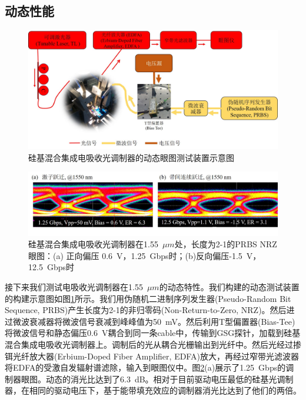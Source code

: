 \subsection{动态性能}
\begin{figure}[htb]
	\centering
	\includegraphics[width=15cm]{./Pictures/chapt4_dynamic_measure_setup.jpg}
	\caption{硅基混合集成电吸收光调制器的动态眼图测试装置示意图}
	\label{chapt4_dynamic_measure_setup}
\end{figure}
\begin{figure}[htb]
	\centering
	\includegraphics[width=15cm]{./Pictures/chapt4_eyediagram.jpg}
	\caption{硅基混合集成电吸收光调制器在1.55~$\mu m$处，长度为2-1的PRBS NRZ眼图：(a) 正向偏压 0.6~V，1.25~Gbps时；(b)反向偏压-1.5~V，12.5~Gbps时}
	\label{chapt4_eyediagram}
\end{figure}
接下来我们测试电吸收光调制器在1.55~$\mu m$的动态特性。我们构建的动态测试装置的构建示意图如图\ref{chapt4_dynamic_measure_setup}所示。我们用伪随机二进制序列发生器(Pseudo-Random Bit Sequence, PRBS)产生长度为2-1的非归零码(Non-Return-to-Zero, NRZ)。然后进过微波衰减器将微波信号衰减到峰峰值为50~mV。然后利用T型偏置器(Bias-Tee)将微波信号和静态偏压0.6~V耦合到同一条cable中，传输到GSG探针，加载到硅基混合集成电吸收光调制器上。调制后的光从耦合光栅输出到光纤中。然后光经过掺铒光纤放大器(Erbium-Doped Fiber Amplifier, EDFA)放大，再经过窄带光滤波器将EDFA的受激自发辐射谱滤除，输入到眼图仪中。图\ref{chapt4_eyediagram}(a)展示了1.25~Gbps的调制器眼图。动态的消光比达到了6.3~dB。相对于目前驱动电压最低的硅基光调制器，在相同的驱动电压下，基于能带填充效应的调制器消光比达到了他们的两倍。

